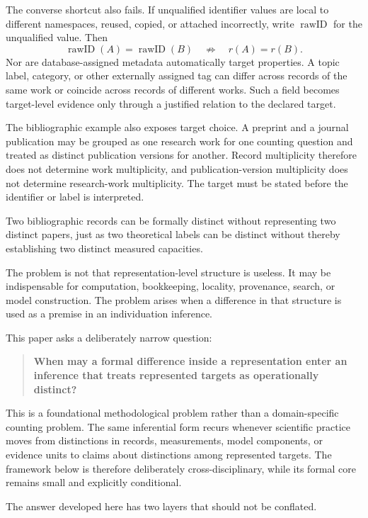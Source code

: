 \documentclass[11pt]{article}
\begin{document}
The converse shortcut also fails. If unqualified identifier values are local to different namespaces, reused, copied, or attached incorrectly, write \(\operatorname{rawID}\) for the unqualified value. Then
\[
\operatorname{rawID}(A)=\operatorname{rawID}(B)
\quad\not\Rightarrow\quad
r(A)=r(B).
\]
Nor are database-assigned metadata automatically target properties. A topic label, category, or other externally assigned tag can differ across records of the same work or coincide across records of different works. Such a field becomes target-level evidence only through a justified relation to the declared target.

The bibliographic example also exposes target choice. A preprint and a journal publication may be grouped as one research work for one counting question and treated as distinct publication versions for another. Record multiplicity therefore does not determine work multiplicity, and publication-version multiplicity does not determine research-work multiplicity. The target must be stated before the identifier or label is interpreted.

Two bibliographic records can be formally distinct without representing two distinct papers, just as two theoretical labels can be distinct without thereby establishing two distinct measured capacities.

The problem is not that representation-level structure is useless. It may be indispensable for computation, bookkeeping, locality, provenance, search, or model construction. The problem arises when a difference in that structure is used as a premise in an individuation inference.

This paper asks a deliberately narrow question:

\begin{quote}
\textbf{When may a formal difference inside a representation enter an inference that treats represented targets as operationally distinct?}
\end{quote}

This is a foundational methodological problem rather than a domain-specific counting problem. The same inferential form recurs whenever scientific practice moves from distinctions in records, measurements, model components, or evidence units to claims about distinctions among represented targets. The framework below is therefore deliberately cross-disciplinary, while its formal core remains small and explicitly conditional.

The answer developed here has two layers that should not be conflated.
\end{document}
